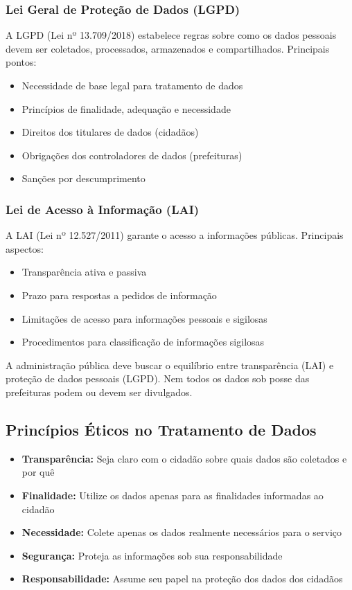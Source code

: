 \documentclass[12pt,a4paper]{article}
\begin{document}
\subsubsection{Lei Geral de Proteção de Dados (LGPD)}
A LGPD (Lei nº 13.709/2018) estabelece regras sobre como os dados pessoais devem ser coletados, processados, armazenados e compartilhados. Principais pontos:
\begin{itemize}
    \item Necessidade de base legal para tratamento de dados
    \item Princípios de finalidade, adequação e necessidade
    \item Direitos dos titulares de dados (cidadãos)
    \item Obrigações dos controladores de dados (prefeituras)
    \item Sanções por descumprimento
\end{itemize}

\subsubsection{Lei de Acesso à Informação (LAI)}
A LAI (Lei nº 12.527/2011) garante o acesso a informações públicas. Principais aspectos:
\begin{itemize}
    \item Transparência ativa e passiva
    \item Prazo para respostas a pedidos de informação
    \item Limitações de acesso para informações pessoais e sigilosas
    \item Procedimentos para classificação de informações sigilosas
\end{itemize}

\begin{tcolorbox}[colback=amareloclaro, colframe=orange!75!black, title=Equilíbrio Necessário]
A administração pública deve buscar o equilíbrio entre transparência (LAI) e proteção de dados pessoais (LGPD). Nem todos os dados sob posse das prefeituras podem ou devem ser divulgados.
\end{tcolorbox}

\subsection{Princípios Éticos no Tratamento de Dados}
\begin{itemize}
    \item \textbf{Transparência:} Seja claro com o cidadão sobre quais dados são coletados e por quê
    \item \textbf{Finalidade:} Utilize os dados apenas para as finalidades informadas ao cidadão
    \item \textbf{Necessidade:} Colete apenas os dados realmente necessários para o serviço
    \item \textbf{Segurança:} Proteja as informações sob sua responsabilidade
    \item \textbf{Responsabilidade:} Assume seu papel na proteção dos dados dos cidadãos
\end{itemize}
\end{document}

